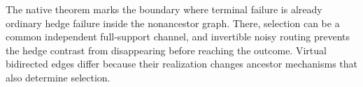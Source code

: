 The native theorem marks the boundary where terminal failure is already ordinary hedge failure inside the nonancestor graph. There, selection can be a common independent full-support channel, and invertible noisy routing prevents the hedge contrast from disappearing before reaching the outcome. Virtual bidirected edges differ because their realization changes ancestor mechanisms that also determine selection.